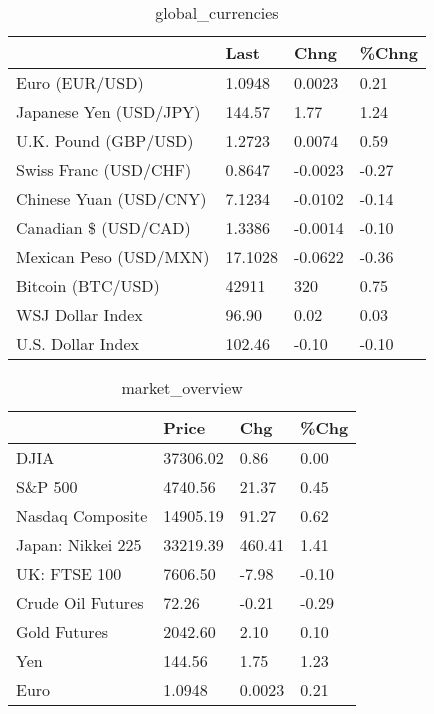 \documentclass{article}%
\begin{document}
%


\begin{table}[htbp]%
\caption{global\_currencies}%
\centering%
\begin{adjustbox}{width=1\textwidth}%
\begin{tabular}{llll}
\toprule
                       &    Last &    Chng & \%Chng \\
\midrule
        Euro (EUR/USD) &  1.0948 &  0.0023 &  0.21 \\
Japanese Yen (USD/JPY) &  144.57 &    1.77 &  1.24 \\
  U.K. Pound (GBP/USD) &  1.2723 &  0.0074 &  0.59 \\
 Swiss Franc (USD/CHF) &  0.8647 & -0.0023 & -0.27 \\
Chinese Yuan (USD/CNY) &  7.1234 & -0.0102 & -0.14 \\
  Canadian \$ (USD/CAD) &  1.3386 & -0.0014 & -0.10 \\
Mexican Peso (USD/MXN) & 17.1028 & -0.0622 & -0.36 \\
     Bitcoin (BTC/USD) &   42911 &     320 &  0.75 \\
      WSJ Dollar Index &   96.90 &    0.02 &  0.03 \\
     U.S. Dollar Index &  102.46 &   -0.10 & -0.10 \\
\bottomrule
\end{tabular}
%
\end{adjustbox}%
\end{table}

%


\begin{table}[htbp]%
\caption{market\_overview}%
\centering%
\begin{adjustbox}{width=1\textwidth}%
\begin{tabular}{llll}
\toprule
                  &    Price &    Chg &  \%Chg \\
\midrule
             DJIA & 37306.02 &   0.86 &  0.00 \\
          S\&P 500 &  4740.56 &  21.37 &  0.45 \\
 Nasdaq Composite & 14905.19 &  91.27 &  0.62 \\
Japan: Nikkei 225 & 33219.39 & 460.41 &  1.41 \\
     UK: FTSE 100 &  7606.50 &  -7.98 & -0.10 \\
Crude Oil Futures &    72.26 &  -0.21 & -0.29 \\
     Gold Futures &  2042.60 &   2.10 &  0.10 \\
              Yen &   144.56 &   1.75 &  1.23 \\
             Euro &   1.0948 & 0.0023 &  0.21 \\
\bottomrule
\end{tabular}
%
\end{adjustbox}%
\end{table}

%
\end{document}
